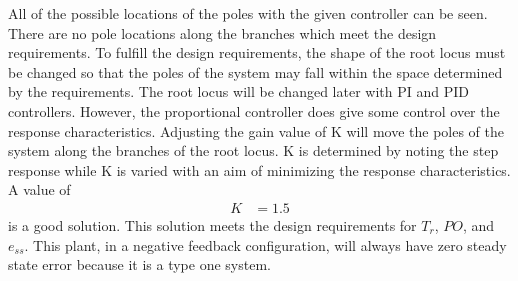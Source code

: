 \documentclass{article}
\begin{document}
    All of the possible locations of the poles with the given controller can be seen.
    There are no pole locations along the branches which meet the design requirements.
    To fulfill the design requirements, the shape of the root locus must be changed so that the poles of the system may fall within the space determined by the requirements.
    The root locus will be changed later with PI and PID controllers.
    However, the proportional controller does give some control over the response characteristics.
    Adjusting the gain value of K will move the poles of the system along the branches of the root locus.
    K is determined by noting the step response while K is varied with an aim of minimizing the response characteristics.
    A value of 
    \begin{equation}
        \begin{aligned}
            K&=1.5
        \end{aligned}
    \end{equation}
    is a good solution.
    This solution meets the design requirements for $T_r$, $PO$, and $e_{ss}$. 
    This plant, in a negative feedback configuration, will always have zero steady state error because it is a type one system.
\end{document}

